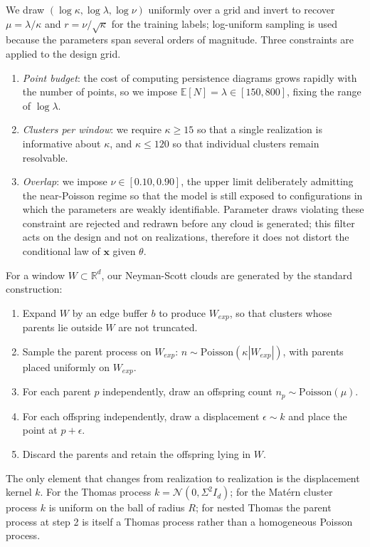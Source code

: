 \documentclass[11pt,a4paper]{article}
\newcommand{\R}{\mathbb{R}}
\newcommand{\E}{\mathbb{E}}
\newcommand{\pc}{\mathbf{x}}
\newcommand{\simpcom}{\Sigma}
\theoremstyle{definitioncolon}
\begin{document}
We draw $(\log\kappa, \log\lambda, \log\nu)$ uniformly over a grid and invert to
recover $\mu = \lambda/\kappa$ and $r = \nu/\sqrt{\kappa}$ for the training labels;
log-uniform sampling
is used because the parameters span several orders of magnitude.
Three constraints are applied to the design grid. 
\begin{enumerate}
    \item \emph{Point budget}: the cost
    of computing persistence diagrams
    grows rapidly with the number of points, so we impose
    $\E[N] = \lambda \in [150, 800]$, fixing the range of
    $\log\lambda$.
    \item \emph{Clusters per window}: we require $\kappa \geq 15$
    so that a single realization is informative about $\kappa$, and
    $\kappa \leq 120$ so that individual clusters remain
    resolvable.
    \item \emph{Overlap}: we impose $\nu \in [0.10, 0.90]$, the upper
    limit deliberately admitting the near-Poisson regime so that the model is
    still exposed to configurations in which the parameters are weakly
    identifiable.
    Parameter draws violating these constraint are rejected and redrawn before any
    cloud is generated; this filter acts on the design and not on realizations,
    therefore it does not distort the conditional law of $\pc$ given $\theta$.
\end{enumerate}

For a window $W \subset \R^d$, our Neyman-Scott clouds are generated by the
standard construction:
    \begin{enumerate}
        \item Expand $W$ by an edge buffer $b$ to produce $W_{exp}$, so that
        clusters whose parents lie outside $W$ are not truncated.
        \item Sample the parent process on $W_{exp}$:
        $n \sim \mathrm{Poisson}(\kappa|W_{exp}|)$, with parents placed uniformly
        on $W_{exp}$.
        \item For each parent $p$ independently, draw an offspring count
        $n_p \sim \mathrm{Poisson}(\mu)$.
        \item For each offspring independently, draw a displacement
        $\epsilon \sim k$ and place the point at $p + \epsilon$.
        \item Discard the parents and retain the offspring lying in $W$.
    \end{enumerate}
The only element that changes from realization to realization is the displacement
kernel $k$. For the Thomas process $k = \mathcal{N}(0, \simpcom^2 I_d)$; for the Mat\'ern
cluster process $k$ is uniform on the ball of radius $R$; for nested Thomas the
parent process at step 2 is itself a Thomas process rather than a homogeneous
Poisson process.
\end{document}
